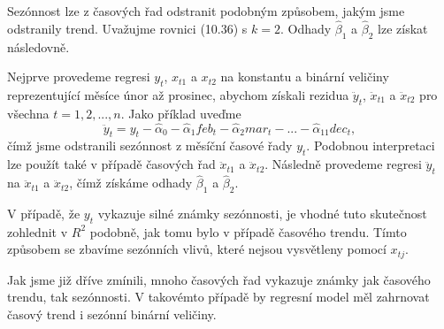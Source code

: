 Sezónnost lze z časových řad odstranit podobným způsobem, jakým 
jsme odstranily trend. Uvažujme rovnici (10.36) s $k = 2$. Odhady 
$\hat{\beta}_1$ a $\hat{\beta}_2$ lze získat následovně.

Nejprve provedeme regresi $y_t$, $x_{t1}$ a $x_{t2}$ na konstantu a 
binární veličiny reprezentující měsíce únor až prosinec, 
abychom získali rezidua $\ddot{y}_t$, $\ddot{x}_{t1}$ a 
$\ddot{x}_{t2}$ pro všechna $t = 1, 2, ..., n$. Jako příklad uveďme
\begin{equation}
\ddot{y}_t = y_t - \hat{\alpha}_0 - \hat{\alpha}_1 feb_t - 
\hat{\alpha}_2 mar_t - ... - \hat{\alpha}_{11} dec_t,
\end{equation}
čímž jsme odstranili sezónnost z měsíční časové řady $y_t$. 
Podobnou interpretaci lze použít také v případě časových řad 
$\ddot{x}_{t1}$ a $\ddot{x}_{t2}$. Následně provedeme regresi $\ddot{y}_t$ na $\ddot{x}_{t1}$ a 
$\ddot{x}_{t2}$, čímž získáme odhady $\hat{\beta}_1$ a $\hat{\beta}_2$.

V případě, že $y_t$ vykazuje silné známky sezónnosti, je vhodné tuto skutečnost zohlednit v $R^2$ podobně, jak tomu bylo v případě časového trendu. Tímto způsobem se zbavíme sezónních vlivů, které nejsou vysvětleny pomocí $x_{tj}$.

Jak jsme již dříve zmínili, mnoho časových řad vykazuje známky 
jak časového trendu, tak sezónnosti. V takovémto případě by 
regresní model měl zahrnovat časový trend i sezónní 
binární veličiny.
